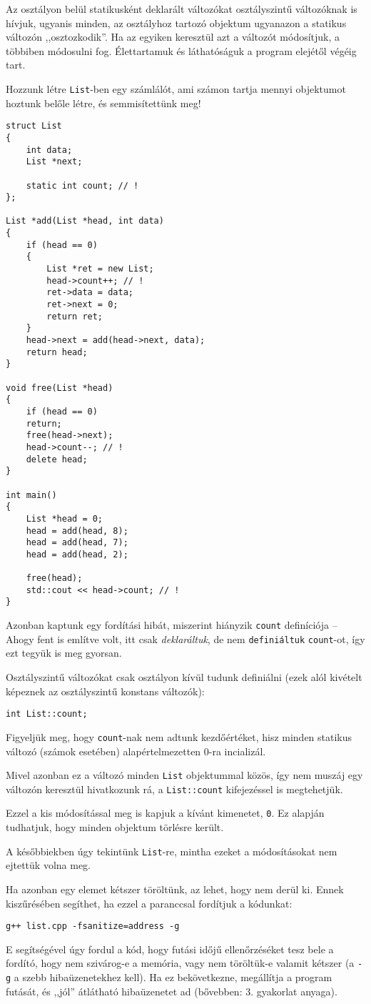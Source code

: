 \documentclass[a4paper,11.5pt,table]{article}
\begin{document}
	\smallskip
	Az osztályon belül statikusként deklarált változókat osztályszintű változóknak is hívjuk, ugyanis minden, az osztályhoz tartozó objektum ugyanazon a statikus változón ,,osztozkodik''. Ha az egyiken keresztül azt a változót módosítjuk, a többiben módosulni fog. Élettartamuk és láthatóságuk a program elejétől végéig tart.
	
	Hozzunk létre \texttt{List}-ben egy számlálót, ami számon tartja mennyi objektumot hoztunk belőle létre, és semmisítettünk meg!
	\begin{lstlisting}
struct List
{
	int data;
	List *next;
	
	static int count; // !
};

List *add(List *head, int data)
{
	if (head == 0)
	{
		List *ret = new List;
		head->count++; // !
		ret->data = data;
		ret->next = 0;
		return ret;
	}
	head->next = add(head->next, data);
	return head;
}

void free(List *head)
{
	if (head == 0)
	return;
	free(head->next);
	head->count--; // !
	delete head;
}

int main()
{
	List *head = 0;
	head = add(head, 8);
	head = add(head, 7);
	head = add(head, 2);
	
	free(head);
	std::cout << head->count; // !
}
	\end{lstlisting}
	Azonban kaptunk egy fordítási hibát, miszerint hiányzik \texttt{count} definíciója -- Ahogy fent is említve volt, itt csak \textit{deklaráltuk}, de nem \texttt{definiáltuk} \texttt{count}-ot, így ezt tegyük is meg gyorsan.
	
	Osztályszintű változókat csak osztályon kívül tudunk definiálni (ezek alól kivételt képeznek az osztályszintű konstans változók):
	\begin{lstlisting}
int List::count;
	\end{lstlisting}
	Figyeljük meg, hogy \texttt{count}-nak nem adtunk kezdőértéket, hisz minden statikus változó (számok esetében) alapértelmezetten 0-ra incializál.
	\smallskip
	
	Mivel azonban ez a változó minden \texttt{List} objektummal közös, így nem muszáj egy változón keresztül hivatkozunk rá, a \texttt{List::count} kifejezéssel is megtehetjük.
	\medskip
	
	Ezzel a kis módosítással meg is kapjuk a kívánt kimenetet, \texttt{0}. Ez alapján tudhatjuk, hogy minden objektum törlésre került.
	\begin{note}
		A későbbiekben úgy tekintünk \texttt{List}-re, mintha ezeket a módosításokat nem ejtettük volna meg.
	\end{note}
	Ha azonban egy elemet kétszer töröltünk, az lehet, hogy nem derül ki. Ennek kiszűrésében segíthet, ha ezzel a paranccsal fordítjuk a kódunkat:
	\begin{center}
		\texttt{g++ list.cpp -fsanitize=address -g}
	\end{center}
	E segítségével úgy fordul a kód, hogy futási időjű ellenőrzéséket tesz bele a fordító, hogy nem szivárog-e a memória, vagy nem töröltük-e valamit kétszer (a \texttt{-g} a szebb hibaüzenetekhez kell). Ha ez bekövetkezne, megállítja a program futását, és ,,jól'' átlátható hibaüzenetet ad (bővebben: 3. gyakorlat anyaga). 
	
\end{document}
